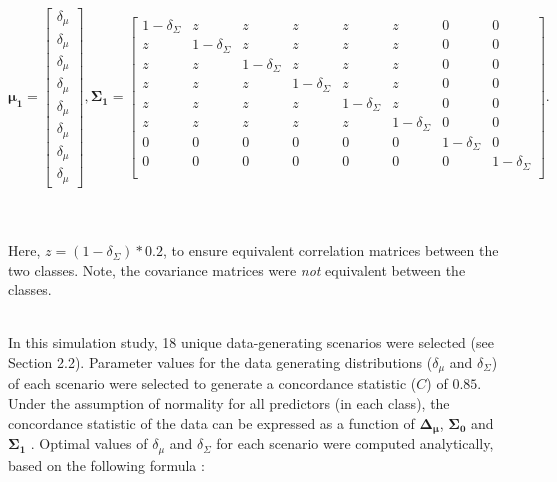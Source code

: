 \documentclass[AMA,STIX1COL,]{WileyNJD-v2}
\begin{document}
\begin{equation*}
\pmb{\mu_1} = \begin{bmatrix}
 \delta_\mu \\ \delta_\mu \\ \delta_\mu \\ \delta_\mu \\ \delta_\mu \\ \delta_\mu \\ \delta_\mu \\ \delta_\mu
\end{bmatrix}, \pmb{\Sigma_1} = \begin{bmatrix}
1 - \delta_\Sigma   & z & z & z & z & z & 0 & 0\\
z & 1 - \delta_\Sigma   & z & z & z & z & 0 & 0\\
z & z & 1 - \delta_\Sigma   & z & z & z & 0 & 0\\
z & z & z   & 1 - \delta_\Sigma & z & z & 0 & 0\\
z & z & z   & z & 1 - \delta_\Sigma & z & 0 & 0\\
z & z & z   & z & z & 1 - \delta_\Sigma & 0 & 0\\
0   & 0   & 0     &  0 & 0    & 0 & 1 - \delta_\Sigma & 0\\
0   & 0   & 0     &  0 & 0    & 0 & 0 & 1 - \delta_\Sigma\\
\end{bmatrix}.
\end{equation*}\\
\strut \\
Here, \(z = (1-\delta_\Sigma)*0.2\), to ensure equivalent correlation
matrices between the two classes. Note, the covariance matrices were
\emph{not} equivalent between the classes.\\
\strut \\
In this simulation study, 18 unique data-generating scenarios were
selected (see Section 2.2). Parameter values for the data generating
distributions (\(\delta_\mu\) and \(\delta_\Sigma\)) of each scenario
were selected to generate a concordance statistic (\(C\)) of \(0.85\).
Under the assumption of normality for all predictors (in each class),
the concordance statistic of the data can be expressed as a function of
\(\pmb{\Delta_\mu}\), \(\pmb{\Sigma_0}\) and \(\pmb{\Sigma_1}\)
\citep{mvauc}. Optimal values of \(\delta_\mu\) and \(\delta_\Sigma\)
for each scenario were computed analytically, based on the following
formula \citep{mvauc}:\\
\strut \\
\end{document}
